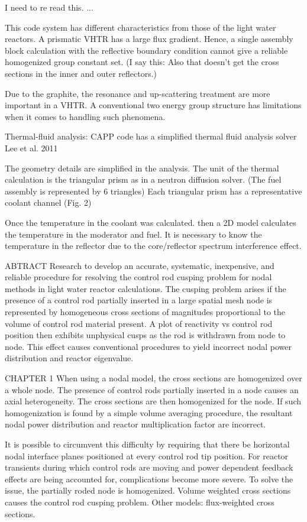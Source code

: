 I need to re read this.
...

This code system has different characteristics from those of the light
water reactors.
A prismatic VHTR has a large flux gradient.
Hence, a single assembly block calculation with the reflective boundary condition cannot give a reliable homogenized group constant set.
(I say this: Also that doesn't get the cross sections in the inner and outer reflectors.)

Due to the graphite, the resonance and up-scattering treatment are more important in a VHTR.
A conventional two energy group structure has limitations when it comes to handling such phenomena.

Thermal-fluid analysis:
CAPP code has a simplified thermal fluid analysis solver
Lee et al. 2011

The geometry details are simplified in the analysis. 
The unit of the thermal calculation is the triangular prism as in a neutron diffusion solver.
(The fuel assembly is represented by 6 triangles)
Each triangular prism has a representative coolant channel (Fig. 2)

Once the temperature in the coolant was calculated. then a 2D model calculates the temperature in the moderator and fuel.
It is necessary to know the temperature in the reflector due to the core/reflector spectrum interference effect.

ABTRACT
Research to develop an accurate, systematic, inexpensive, and reliable procedure for resolving the control rod cusping problem for nodal methods in light water reactor calculations.
The cusping problem arises if the presence of a control rod partially inserted in a large spatial mesh node is represented by homogeneous cross sections of magnitudes proportional to the volume of control rod material present.
A plot of reactivity vs control rod position then exhibits unphysical cusps as the rod is withdrawn from node to node.
This effect causes conventional procedures to yield incorrect nodal power distribution and reactor eigenvalue.

CHAPTER 1
When using a nodal model, the cross sections are homogenized over a whole node.
The presence of control rods partially inserted in a node causes an axial heterogeneity.
The cross sections are then homogenized for the node.
If such homogenization is found by a simple volume averaging procedure, the resultant nodal power distribution and reactor multiplication factor are incorrect.

It is possible to circumvent this difficulty by requiring that there be horizontal nodal interface planes positioned at every control rod tip position.
For reactor transients during which control rods are moving and power dependent feedback effects are being accounted for, complications become more severe.
To solve the issue, the partially roded node is homogenized.
Volume weighted cross sections causes the control rod cusping problem.
Other models: flux-weighted cross sections.

